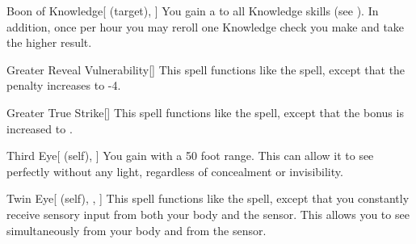 \lowercase{\hypertarget{spell:Boon of Knowledge}{}}\label{spell:Boon of Knowledge}
\begin{attuneability}[\nth{3}]{\hypertarget{spell:Boon of Knowledge}{Boon of Knowledge}}[ (target), ]
You gain a   to all Knowledge skills (see ).
In addition, once per hour you may reroll one Knowledge check you make and take the higher result.
\end{attuneability}
\vspace{0.25em}



\lowercase{\hypertarget{spell:Greater Reveal Vulnerability}{}}\label{spell:Greater Reveal Vulnerability}
\begin{freeability}[\nth{3}]{\hypertarget{spell:Greater Reveal Vulnerability}{Greater Reveal Vulnerability}}[]
This spell functions like the  spell, except that the penalty increases to -4.
\end{freeability}
\vspace{0.25em}



\lowercase{\hypertarget{spell:Greater True Strike}{}}\label{spell:Greater True Strike}
\begin{freeability}[\nth{3}]{\hypertarget{spell:Greater True Strike}{Greater True Strike}}[]
This spell functions like the  spell, except that the bonus is increased to .
\end{freeability}
\vspace{0.25em}



\lowercase{\hypertarget{spell:Third Eye}{}}\label{spell:Third Eye}
\begin{attuneability}[\nth{3}]{\hypertarget{spell:Third Eye}{Third Eye}}[ (self), ]
You gain  with a 50 foot range.
This can allow it to see perfectly without any light, regardless of concealment or invisibility.
\end{attuneability}
\vspace{0.25em}



\lowercase{\hypertarget{spell:Twin Eye}{}}\label{spell:Twin Eye}
\begin{attuneability}[\nth{3}]{\hypertarget{spell:Twin Eye}{Twin Eye}}[ (self), , ]
This spell functions like the  spell, except that you constantly receive sensory input from both your body and the sensor.
This allows you to see simultaneously from your body and from the sensor.
\end{attuneability}
\vspace{0.25em}



